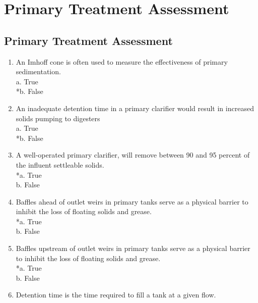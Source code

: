 
\chapter{Primary Treatment Assessment}

\section*{Primary Treatment Assessment}

\begin{enumerate}
\item  An Imhoff cone is often used to measure the effectiveness of primary sedimentation. \\

a. True \\
*b. False \\


\item  An inadequate detention time in a primary clarifier would result in increased solids pumping to digesters \\

a. True \\
*b. False \\


\item  A well-operated primary clarifier, will remove between 90 and 95 percent of the influent settleable solids. \\

*a. True \\
b. False \\


\item  Baffles ahead of outlet weirs in primary tanks serve as a physical barrier to inhibit the loss of floating solids and grease. \\

*a. True \\
b. False \\


\item  Baffles upstream of outlet weirs in primary tanks serve as a physical barrier to inhibit the loss of floating solids and grease. \\

*a. True \\
b. False \\


\item  Detention time is the time required to fill a tank at a given flow. \\


\end{enumerate}

